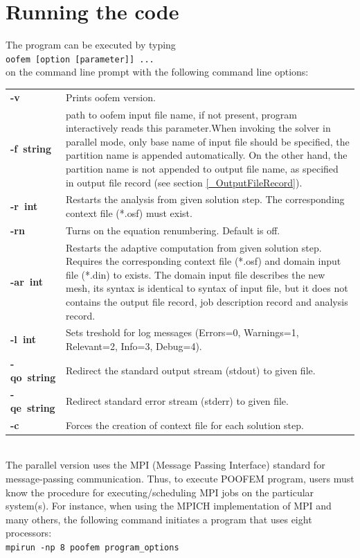 \documentclass[a4paper]{article}
\newcommand{\Pmode}[1]{{\sffamily #1}}
\begin{document}
\section{Running the code}
\label{_running_the_code}
The program can be executed by typing\\
\texttt{oofem [option [parameter]] ...}\\
on the command line prompt with the following command line options:\\[1em]
\begin{tabularx}{\textwidth}{l|X}
\hline
\textbf{\mbox{-v}} & Prints oofem version.\\
\textbf{\mbox{-f~string}} & path to oofem input file name, if not present, program interactively
reads this parameter.\Pmode{When invoking the solver in parallel mode, only base name of input file should be specified, 
the partition name is appended automatically. On the other hand, the partition name is not appended to output file name, as specified
in output file record (see section \ref{_OutputFileRecord}).}\\
\textbf{\mbox{-r~int}} & Restarts the analysis from given solution step. The corresponding
context file (*.osf) must exist.\\
\textbf{\mbox{-rn}} & Turns on the equation renumbering. Default is off.\\
\textbf{\mbox{-ar~int}} & 
Restarts the adaptive computation from given solution step.
Requires the corresponding context file (*.osf) and domain input file
(*.din) to exists. The domain input file describes the new mesh, its
syntax is identical to syntax of input file, but it does not contains
the output file record, job description record and analysis record.\\
\textbf{\mbox{-l~int}} & Sets treshold for log messages (Errors=0, Warnings=1,
Relevant=2, Info=3, Debug=4).\\
\textbf{\mbox{-qo~string}} & Redirect the standard output stream (stdout) to given file.\\
\textbf{\mbox{-qe~string}} & Redirect standard error stream (stderr) to given file.\\
\textbf{\mbox{-c}} & Forces the creation of context file for each solution step.\\
\hline
\end{tabularx}\\[1em]

\Pmode{
The parallel version uses the MPI (Message Passing Interface) standard for message-passing communication. Thus, to execute POOFEM program,
users must know the procedure for executing/scheduling MPI jobs on the particular system(s).
For instance, when using the MPICH implementation of MPI and many others, the following command initiates a program that uses eight processors: \\[2mm]
\texttt{mpirun -np 8 poofem program\_options}
}
\end{document}
